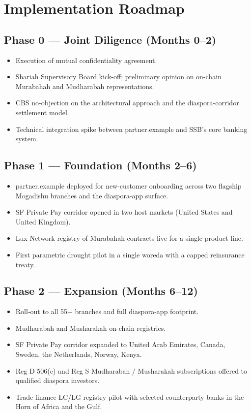 \documentclass[11pt,letterpaper]{article}
\begin{document}
\section{Implementation Roadmap}

\subsection{Phase 0 --- Joint Diligence (Months 0--2)}
\begin{itemize}[leftmargin=1.6em]
  \item Execution of mutual confidentiality agreement.
  \item Shariah Supervisory Board kick-off; preliminary opinion on
        on-chain Murabahah and Mudharabah representations.
  \item CBS no-objection on the architectural approach and the
        diaspora-corridor settlement model.
  \item Technical integration spike between partner.example and SSB's
        core banking system.
\end{itemize}

\subsection{Phase 1 --- Foundation (Months 2--6)}
\begin{itemize}[leftmargin=1.6em]
  \item partner.example deployed for new-customer onboarding across two
        flagship Mogadishu branches and the diaspora-app surface.
  \item SF Private Pay corridor opened in two host markets (United
        States and United Kingdom).
  \item Lux Network registry of Murabahah contracts live for a
        single product line.
  \item First parametric drought pilot in a single woreda with a
        capped reinsurance treaty.
\end{itemize}

\subsection{Phase 2 --- Expansion (Months 6--12)}
\begin{itemize}[leftmargin=1.6em]
  \item Roll-out to all 55+ branches and full diaspora-app footprint.
  \item Mudharabah and Musharakah on-chain registries.
  \item SF Private Pay corridor expanded to United Arab Emirates,
        Canada, Sweden, the Netherlands, Norway, Kenya.
  \item Reg D 506(c) and Reg S Mudharabah / Musharakah subscriptions
        offered to qualified diaspora investors.
  \item Trade-finance LC/LG registry pilot with selected counterparty
        banks in the Horn of Africa and the Gulf.
\end{itemize}
\end{document}

